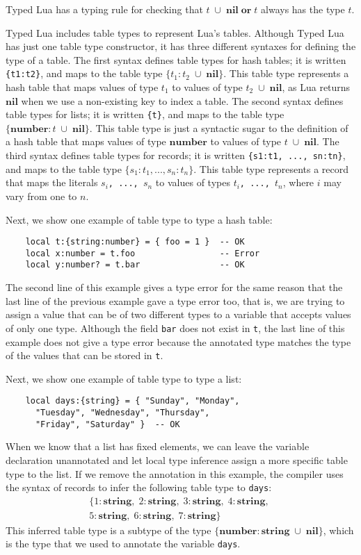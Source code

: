 \documentclass[preprint]{sig-alternate}
\newcommand{\Nil}{\mathbf{nil}}
\newcommand{\Number}{\mathbf{number}}
\newcommand{\String}{\mathbf{string}}
\begin{document}
Typed Lua has a typing rule for checking that
$t\;\cup\;\Nil\;\mathbf{or}\;t$ always has the type $t$.

Typed Lua includes table types to represent Lua's tables.
Although Typed Lua has just one table type constructor, it has three
different syntaxes for defining the type of a table.
The first syntax defines table types for hash tables;
it is written \verb'{t1:t2}',
and maps to the table type $\{t_{1}:t_{2}\;\cup\;\Nil\}$.
This table type represents a hash table that maps values of type
$t_{1}$ to values of type $t_{2}\;\cup\;\Nil$, as Lua returns
$\Nil$ when we use a non-existing key to index a table.
The second syntax defines table types for lists;
it is written \verb'{t}',
and maps to the table type $\{\Number:t\;\cup\;\Nil\}$.
This table type is just a syntactic sugar to the definition of a
hash table that maps values of type $\Number$ to values of type
$t\;\cup\;\Nil$.
The third syntax defines table types for records;
it is written \verb'{s1:t1, ..., sn:tn}',
and maps to the table type $\{s_{1}:t_{1}, ..., s_{n}:t_{n}\}$.
This table type represents a record that maps the literals
$s_{i}$\verb', ..., '$s_{n}$ to values of types
$t_{i}$\verb', ..., '$t_{n}$, where $i$ may vary from one to $n$.

Next, we show one example of table type to type a hash table:
\begin{verbatim}
    local t:{string:number} = { foo = 1 }  -- OK
    local x:number = t.foo                 -- Error
    local y:number? = t.bar                -- OK
\end{verbatim}

The second line of this example gives a type error for the same
reason that the last line of the previous example gave a type error
too, that is, we are trying to assign a value that can be of two
different types to a variable that accepts values of only one type.
Although the field \verb'bar' does not exist in \verb't', the last
line of this example does not give a type error because the
annotated type matches the type of the values that can be stored in
\verb't'.

Next, we show one example of table type to type a list:
\begin{verbatim}
    local days:{string} = { "Sunday", "Monday",
      "Tuesday", "Wednesday", "Thursday",
      "Friday", "Saturday" }  -- OK
\end{verbatim}

When we know that a list has fixed elements, we can leave the
variable declaration unannotated and let local type inference assign
a more specific table type to the list.
If we remove the annotation in this example, the compiler uses the
syntax of records to infer the following table type to \verb'days':
\begin{align*}
\{{1:\String},\;{2:\String},\;{3:\String},\;{4:\String},\;\\
{5:\String},\;{6:\String},\;{7:\String}\}
\end{align*}
This inferred table type is a subtype of the type
$\{\Number:\String\;\cup\;\Nil\}$, which is the type that we used to
annotate the variable \verb'days'.
\end{document}
